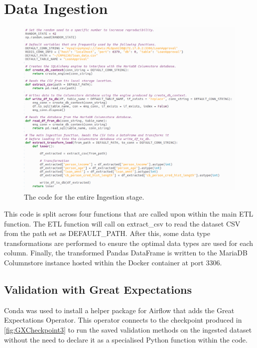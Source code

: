 \documentclass[12pt]{report}
\newcommand{\para}{\vspace{7pt}\noindent}
\begin{document}
\section{Data Ingestion}\label{sec:ImpIngestion}

\begin{figure}[H]
    \centering
    \includegraphics[width=\linewidth]{Implementation/.Code/PipelineFunctions/Ingestion.png}
    \caption{The code for the entire Ingestion stage.}
    \label{fig:IngestionCode}
\end{figure}

\para This code is split across four functions that are called upon within the main 
ETL function. The ETL function will call on extract\_csv to read the dataset CSV from 
the path set as DEFAULT\_PATH. After this, some data type transformations are performed 
to ensure the optimal data types are used for each column. Finally, the transformed 
Pandas DataFrame is written to the MariaDB Columnstore instance hosted within the Docker 
container at port 3306.

\subsection{Validation with Great Expectations}
\para Conda was used to install a helper package for Airflow that adds the Great Expectations Operator.
This operator connects to the checkpoint produced in \ref{fig:GXCheckpoint3} to run the saved validation 
methods on the ingested dataset without the need to declare it as a specialised Python function within 
the code. 
\end{document}
